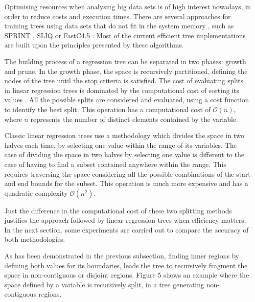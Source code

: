 \documentclass[times,twocolumn,final,authoryear]{elsarticle}
\begin{document}
Optimising resources when analysing big data sets is of high interest nowadays, in order to reduce costs and execution times. There are several approaches for training trees using data sets that do not fit in the system memory \citep{Rokach2016}, such as SPRINT \citep{Shareretal1996}, SLIQ \citep{Mehtaetal1996} or FastC4.5 \citep{Heetal2007}. Most of the current efficient tree implementations are built upon the principles presented by these algorithms.

The building process of a regression tree can be separated in two phases: growth and prune. In the growth phase, the space is recursively partitioned, defining the nodes of the tree until the stop criteria is satisfied. The cost of evaluating splits in linear regression trees is dominated by the computational cost of sorting its values \citep{Shareretal1996}. All the possible splits are considered and evaluated, using a cost function to identify the best split. This operation has a computational cost of $\mathcal{O}(n)$, where $n$ represents the number of distinct elements contained by the variable.

Classic linear regression trees use a methodology which divides the space in two halves each time, by selecting one value within the range of its variables. The case of dividing the space in two halves by selecting one value is different to the case of having to find a subset contained anywhere within the range. This requires traversing the space considering all the possible combinations of the start and end bounds for the subset. This operation is much more expensive and has a quadratic complexity $\mathcal{O}(n^2)$.

Just the difference in the computational cost of these two splitting methods justifies the approach followed by linear regression trees when efficiency matters. In the next section, some experiments are carried out to compare the accuracy of both methodologies.

As has been demonstrated in the previous subsection, finding inner regions by defining both values for its boundaries, leads the tree to recursively fragment the space in non-contiguous or disjoint regions. Figure 5 shows an example where the space defined by a variable is recursively split, in a tree generating non-contiguous regions.

%
%
\end{document}
